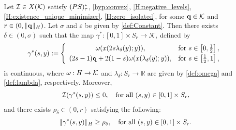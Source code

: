 \documentclass[10pt,a4paper]{amsart}
\newcommand{\Hilb}{{\textnormal H}}
\newcommand{\PS}{(\textnormal{PS})^{*}_\tau}
\newcommand{\R}{\mathbb{R}}
\newcommand{\X}{{\textnormal X}}
\newcommand{\boI}{\mathcal{I}}
\newcommand{\boK}{\mathcal{K}}
\newcommand{\minq}{{\bf q}}
\begin{document}
\begin{proposition}\label{Pro:Gamma}
Let $\boI\in\X(\boK)$ satisfy $\PS$, \eqref{hyp:convex}, \eqref{H:negative_levels}, \eqref{H:existence_unique_minimizer}, \eqref{H:zero_isolated}, for some $\minq\in\boK$ and $r\in(0,\|\minq\|_\Hilb)$. Let $\sigma$ and $\varepsilon$ be given by \eqref{def:Constant}. Then there exists $\delta\in(0,\sigma)$ such that the map $\gamma^*:[0,1]\times S_r\to\boK$, defined by
\begin{equation}\label{def:gamma*}
    \gamma^*(s,y):=\left\{\begin{array}{cl}
         \omega(x(2s\lambda_\delta(y);y)),&\hbox{for }s\in\left[0,\tfrac{1}{2}\right],  \vspace{1mm} \\ 
         (2s-1)\minq+2(1-s)\omega(x(\lambda_\delta(y);y)),&\hbox{for } s\in\left[\tfrac{1}{2},1\right],
    \end{array}\right.
\end{equation}    
is continuous, where $\omega:\Hilb\to\boK$ and $\lambda_\delta:S_r\to\R$ are given by \eqref{def:omega} and \eqref{def:lambda}, respectively. Moreover,
\begin{equation}
\label{eq:gamma-negativeflow}
    \boI(\gamma^*(s,y))\leq0,\quad  \hbox{for all }(s,y)\in[0,1]\times S_r,
\end{equation}and there exists $\rho_\delta\in (0,r)$ satisfying the following:
\begin{equation}\label{eq:gamma-notzero}
    \|\gamma^*(s,y)\|_\Hilb\geq \rho_\delta,\quad \hbox{for all }(s,y)\in[0,1]\times S_r.
\end{equation}
\end{proposition}
\end{document}

